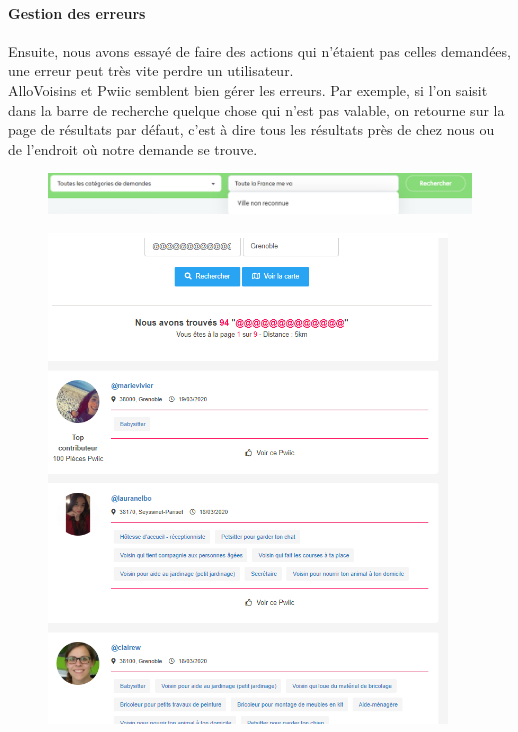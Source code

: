 \documentclass[a4paper,11pt]{article}
\begin{document}
\paragraph{Gestion des erreurs}

Ensuite, nous avons essayé de faire des actions qui n’étaient pas celles demandées, une erreur peut très vite perdre un utilisateur.\\

AlloVoisins et Pwiic semblent bien gérer les erreurs. Par exemple, si l’on saisit dans la barre de recherche quelque chose
qui n’est pas valable, on retourne sur la page de résultats par défaut, c’est à dire tous les résultats près de
chez nous ou de l’endroit où notre demande se trouve.\\

\begin{figure}[H]
  \includegraphics[width=\linewidth]{images/gestion-erreur-allovoisins.png}
  \label{fig:gestion-erreur-allovoisins}
\end{figure}

\begin{figure}[H]
  \includegraphics[width=400px]{images/gestion-erreur-yakasaider.png}
  \label{fig:gestion-erreur-yakasaider}
\end{figure}
\end{document}
